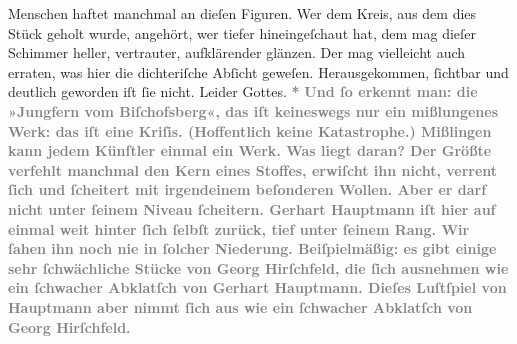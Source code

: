 \begin{ledgroupsized}[t]{13cm}
{{                  Menschen haftet manchmal an dieſen Figuren. Wer dem Kreis, aus dem dies Stück
                  geholt wurde, angehört, wer tiefer hineingeſchaut hat, dem mag dieſer Schimmer
                  heller, vertrauter, aufklärender glänzen. Der mag vielleicht auch erraten, was
                  hier die dichteriſche Abſicht geweſen. Herausgekommen, ſichtbar und deutlich
                  geworden iſt ſie nicht. Leider Gottes.}}\pend
           \pstart
           \centering{}\textcolor{gray}{\textbf{*}}\pend
           \pstart
           \noindent{}\textcolor{gray}{\textbf{Und ſo erkennt man: die »Jungfern vom Biſchofsberg«, das iſt keineswegs nur ein mißlungenes Werk:
                  das iſt eine Kriſis. (Hoffentlich keine Katastrophe.) Mißlingen kann jedem
                  Künſtler einmal ein Werk. Was liegt daran? Der Größte verfehlt manchmal den Kern
                  eines Stoffes, erwiſcht ihn nicht, verrent ſich und ſcheitert mit irgendeinem
                  beſonderen Wollen. Aber er darf nicht unter ſeinem Niveau ſcheitern. Gerhart Hauptmann iſt hier auf einmal weit
                  hinter ſich ſelbſt zurück, tief unter ſeinem Rang. Wir ſahen ihn noch nie in
                  ſolcher Niederung. Beiſpielmäßig: es gibt einige sehr ſchwächliche Stücke von Georg Hirſchfeld, die ſich ausnehmen wie ein
                  ſchwacher Abklatſch von Gerhart Hauptmann.
                  Dieſes Luſtſpiel von Hauptmann aber nimmt ſich aus wie ein
                  ſchwacher Abklatſch von Georg Hirſchfeld.
}}
\end{ledgroupsized}
